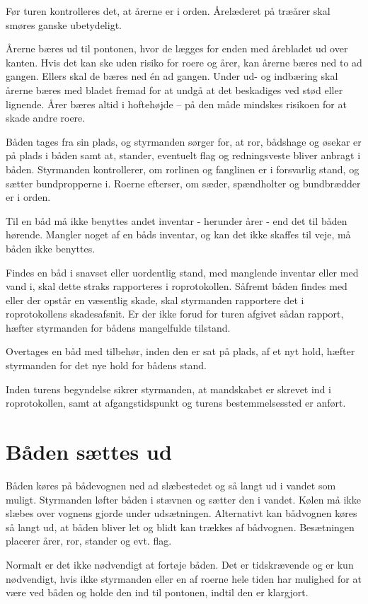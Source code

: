 \documentclass{article}
\begin{document}
Før turen kontrolleres det, at årerne er i orden. Årelæderet på træårer
skal smøres ganske ubetydeligt.

Årerne bæres ud til pontonen, hvor de lægges for enden med årebladet ud
over kanten. Hvis det kan ske uden risiko for roere og årer, kan årerne
bæres ned to ad gangen. Ellers skal de bæres ned én ad gangen. Under ud-
og indbæring skal årerne bæres med bladet fremad for at undgå at det
beskadiges ved stød eller lignende.  Årer bæres altid i hoftehøjde – på
den måde mindskes risikoen for at skade andre roere.

Båden tages fra sin plads, og styrmanden sørger for, at ror, bådshage og
øsekar er på plads i båden samt at, stander, eventuelt flag og
redningsveste bliver anbragt i båden. Styrmanden kontrollerer, om
rorlinen og fanglinen er i forsvarlig stand, og sætter bundpropperne i.
Roerne efterser, om sæder, spændholter og bundbrædder er i orden.

Til en båd må ikke benyttes andet inventar - herunder årer - end det til
båden hørende. Mangler noget af en båds inventar, og kan det ikke skaffes
til veje, må båden ikke benyttes.

Findes en båd i snavset eller uordentlig stand, med manglende inventar
eller med vand i, skal dette straks rapporteres i roprotokollen. Såfremt
båden findes med eller der opstår en væsentlig skade, skal styrmanden
rapportere det i roprotokollens skadesafsnit. Er der ikke forud for turen
afgivet sådan rapport, hæfter styrmanden for bådens mangelfulde tilstand.

Overtages en båd med tilbehør, inden den er sat på plads, af et nyt hold,
hæfter styrmanden for det nye hold for bådens stand.

Inden turens begyndelse sikrer styrmanden, at mandskabet er skrevet ind i
roprotokollen, samt at afgangstidspunkt og turens bestemmelsessted er
anført.

\section{Båden sættes ud}

Båden køres på bådevognen ned ad slæbestedet og så langt ud i vandet som
muligt. Styrmanden løfter båden i stævnen og sætter den i vandet. Kølen
må ikke slæbes over vognens gjorde under udsætningen. Alternativt kan
bådvognen køres så langt ud, at båden bliver let og blidt kan trækkes af
bådvognen. Besætningen placerer årer, ror, stander og evt. flag.

Normalt er det ikke nødvendigt at fortøje båden. Det er tidskrævende og
er kun nødvendigt, hvis ikke styrmanden eller en af roerne hele tiden har
mulighed for at være ved båden og holde den ind til pontonen, indtil den
er klargjort.
\end{document}
